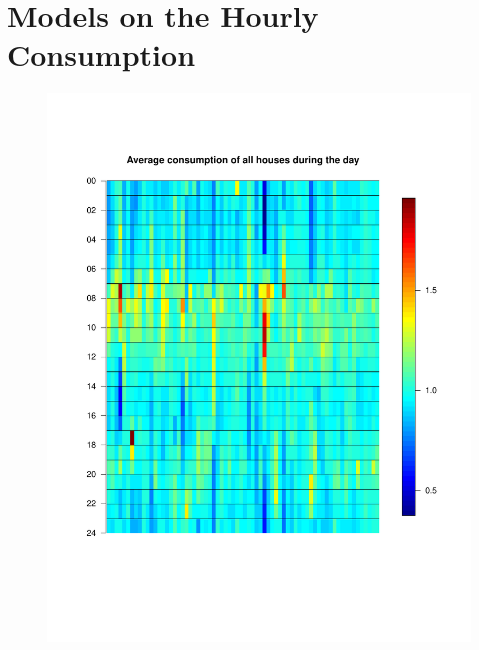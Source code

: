 \section{Models on the Hourly Consumption}






\begin{figure}
    \centering
    \includegraphics[width=.8\textwidth]{../../../figures/Heatmap.pdf}
    \caption{}
    \label{fig: daily_cons}
\end{figure}